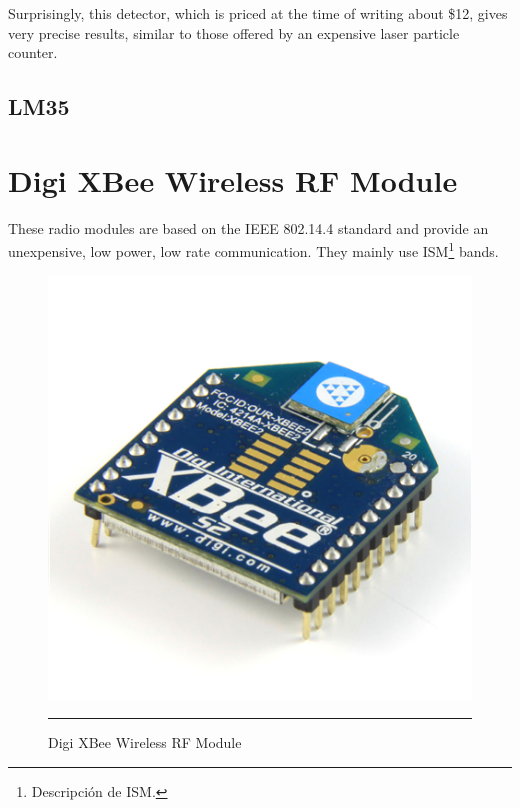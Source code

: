 Surprisingly, this detector, which is priced at the time of writing about \$12, gives very precise results, similar to those offered by an expensive laser particle counter.\citep{airquality}


\subsection{LM35}



\section{Digi XBee\textregistered{} Wireless RF Module}
\label{sec:xbee}

These radio modules are based on the IEEE 802.14.4 standard and provide an unexpensive, low power, low rate communication. They mainly use ISM\footnote{Descripción de ISM.} bands. 

\begin{figure}[htbp]
    \centering
    \includegraphics[scale=0.4]{./Figures/xbee.png}
        \rule{35em}{0.5pt}
        \caption[Digi XBee RF Module]{Digi XBee\textregistered{} Wireless RF Module}
    \label{fig:XBee RF Module}
\end{figure}

